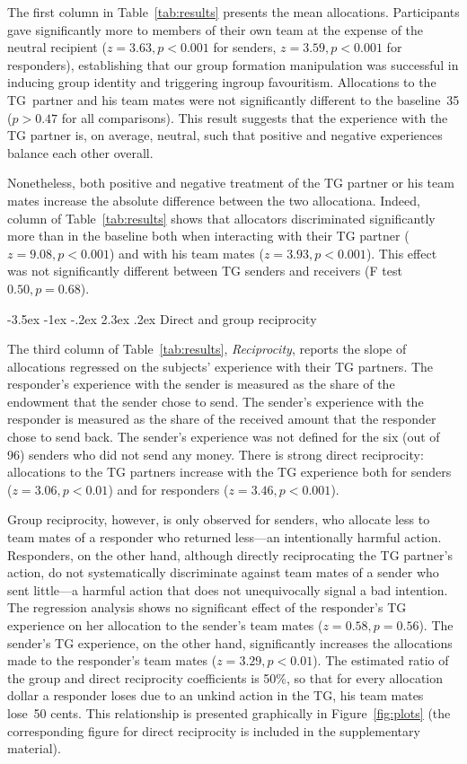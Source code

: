 \documentclass[12pt,a4paper]{article}\usepackage[]{graphicx}\usepackage[]{color}
\makeatletter
\renewcommand\subsection{\@startsection {subsection}{1}{\z@}%
{-3.5ex \@plus -1ex \@minus -.2ex}%
{2.3ex \@plus.2ex}%
{\it\large}}
\makeatother
\begin{document}
The first column in Table~\ref{tab:results} presents the mean allocations.
Participants gave significantly more to members of their own team at the expense
of the neutral recipient ($z=3.63,p< 0.001$ for senders, 
$z=3.59,p< 0.001$ for
responders), establishing that our group formation manipulation was successful
in inducing group identity and triggering ingroup favouritism. Allocations to
the TG~partner and his team mates were not significantly different to the
baseline~35 ($p>0.47$ for all comparisons). This result suggests that the experience with the TG partner is, on average, neutral, such that positive and negative experiences balance each other overall.

Nonetheless, both positive and negative treatment of the TG partner or his team mates increase the absolute difference between the two allocationa. Indeed,
column of Table~\ref{tab:results} shows that allocators discriminated significantly more
than in the baseline both when interacting with their TG partner
($z=9.08,p< 0.001$) and with his team mates 
($z=3.93,p< 0.001$). This effect was not
significantly different between TG senders and receivers (F test $0.50,
p= 0.68$).

\subsection{Direct and group reciprocity}
\label{sec:reciprocity}

The third column of Table~\ref{tab:results}, \emph{Reciprocity}, reports the slope of
allocations regressed on the subjects' experience with their TG partners. 
The responder's experience with the sender is measured
as the share of the endowment that the sender chose to send. The sender's experience with the responder is measured as the share
of the received amount that the responder chose to send back. 
The sender's experience was not defined
for the six (out of 96) senders who did not send any money.
%
There is strong direct reciprocity: allocations
to the TG partners increase with the TG experience both for
senders ($z=3.06,p< 0.01$) and for responders 
($z=3.46,p< 0.001$).

Group reciprocity, however, is only observed for senders, who allocate
less to team mates of a responder who returned less---an intentionally harmful action.
Responders, on the other hand, although directly reciprocating the
TG partner's action, do not systematically discriminate against team mates
of a sender who sent little---a harmful action that does not unequivocally
signal a bad intention. The regression analysis shows no significant
effect of the responder's TG experience on her allocation to the sender's
team mates ($z=0.58,p= 0.56$). 
The sender's TG experience, on the other
hand, significantly increases the allocations made to the responder's team mates 
($z=3.29,p< 0.01$).
The estimated ratio of the group and direct reciprocity coefficients
is 50\%, so that for every allocation dollar a responder
loses due to an unkind action in the TG, his team mates lose~50 cents. 
This relationship is presented graphically in Figure~\ref{fig:plots} (the corresponding figure for direct reciprocity is included in the supplementary material).
\end{document}
